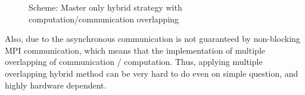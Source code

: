 \begin{figure}[htbp]
  \centering
  \caption{Scheme: Master only hybrid strategy with computation/communication overlapping}
  \label{FIG:master_only_hybrid_1}
\end{figure}
Also, due to the asynchronous communication is not guaranteed by non-blocking MPI communication,
which means that the implementation of multiple overlapping of communication / computation.
Thus, applying multiple overlapping hybrid method can be very hard to do even on simple question, and highly hardware dependent.


